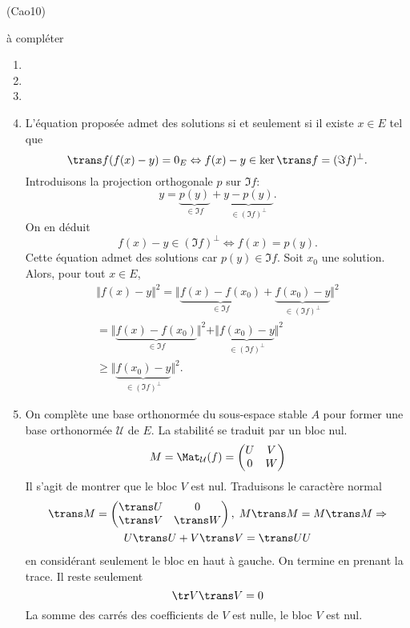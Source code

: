 \begin{tiny}(Cao10)\end{tiny} à compléter
\begin{enumerate}
  \item 
  \item
  \item 
  \item L'équation proposée admet des solutions si et seulement si il existe $x\in E$ tel que
\[
  \trans f(f(x) - y) = 0_E
  \Leftrightarrow
  f(x) - y \in \ker \trans f = (\Im f)^\bot. 
\]
Introduisons la projection orthogonale $p$ sur $\Im f$:
\[
  y = \underset{ \in \Im f}{\underbrace{p(y)}} + \underset{ \in (\Im f)^\bot}{\underbrace{y - p(y)}}.
\]
On en déduit
\[
  f(x) - y \in (\Im f)^\bot
  \Leftrightarrow
  f(x) = p(y).
\]
Cette équation admet des solutions car $p(y) \in \Im f$.\newline
Soit $x_0$ une solution. Alors, pour tout $x \in E$,
\begin{multline*}
  \Vert f(x) - y \Vert ^2
  = \Vert \underset{ \in \Im f}{\underbrace{f(x) - f(x_0)}} + \underset{ \in (\Im f)^\bot}{\underbrace{f(x_0) - y}} \Vert ^2 \\
  =  \Vert \underset{ \in \Im f}{\underbrace{f(x) - f(x_0)}}\Vert ^2 + \Vert \underset{ \in (\Im f)^\bot}{\underbrace{f(x_0) - y}} \Vert ^2\\
  \geq \Vert \underset{ \in (\Im f)^\bot}{\underbrace{f(x_0) - y}} \Vert ^2.
\end{multline*}


  \item On complète une base orthonormée du sous-espace stable $A$ pour former une base orthonormée $\mathcal{U}$ de $E$. La stabilité se traduit par un bloc nul.
\begin{displaymath}
M = \Mat_{\mathcal{U}}(f)=
\begin{pmatrix}
  U & V \\ 0 & W
\end{pmatrix}
\end{displaymath}
Il s'agit de montrer que le bloc $V$ est nul. Traduisons le caractère normal
\begin{multline*}
\trans M =
\begin{pmatrix}
  \trans U & 0 \\ \trans V & \trans W
\end{pmatrix}, \;
M \trans M = M \trans M \Rightarrow\\
  U\trans U + V\trans V =\trans U U
\end{multline*}
en considérant seulement le bloc en haut à gauche. On termine en prenant la trace. Il reste seulement
\begin{displaymath}
  \tr V\trans V = 0
\end{displaymath}
La somme des carrés des coefficients de $V$ est nulle, le bloc $V$ est nul.
\end{enumerate}
